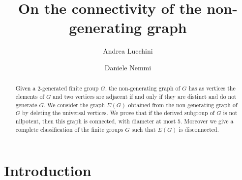 \documentclass{amsart}
\numberwithin{equation}{section}
\begin{document}
	
\title[On the connectivity of the non-generating graph]{On the connectivity of the non-generating graph}

\author{Andrea Lucchini}
\address{Andrea Lucchini\\ Universit\`a di Padova\\  Dipartimento di Matematica \lq\lq Tullio Levi-Civita\rq\rq\\ Via Trieste 63, 35121 Padova, Italy\\email: lucchini@math.unipd.it}
\author{Daniele Nemmi}
\address{Daniele Nemmi\\ Universit\`a di Padova\\  Dipartimento di Matematica \lq\lq Tullio Levi-Civita\rq\rq\\ Via Trieste 63, 35121 Padova, Italy\\email: dnemmi@math.unipd.it}



\begin{abstract} Given a 2-generated finite  group $G$,  the non-generating graph   of $G$ has as  vertices the  elements of $G$ and two vertices  are adjacent if and only if they are distinct and do not generate $G$. We consider the graph $\Sigma(G)$ obtained from the non-generating graph of $G$ by deleting the universal vertices. We prove that if the derived subgroup of $G$ is not nilpotent, then this graph is connected, with diameter at most 5. Moreover we give a complete classification of the finite groups $G$ such that $\Sigma(G)$ is disconnected.	\end{abstract}



\maketitle



\hbox{}



\section{Introduction}

	
	
\end{document}
